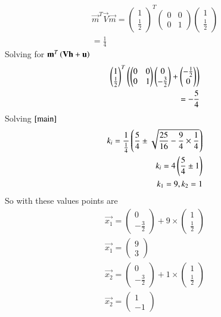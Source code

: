 \documentclass[a5paper,10pt]{article}
\begin{document}
\begin{align}
    \vec{m}^T\vec{V}\vec{m}=\begin{pmatrix}1 \\ \frac{1}{2}\end{pmatrix}^T\begin{pmatrix}0&0\\0&1\end{pmatrix}\begin{pmatrix}1 \\ \frac{1}{2}\end{pmatrix}\\
    =\frac{1}{4}\label{mv}
\end{align}
Solving for $\mathbf{m}^T\left(\mathbf{V}\mathbf{h}+\mathbf{u}\right)$
\begin{align}
    \begin{pmatrix}1 \\ \frac{1}{2}\end{pmatrix}^T\left(\begin{pmatrix}0&0\\0&1\end{pmatrix}\begin{pmatrix}0\\-\frac{3}{2}\end{pmatrix}+\begin{pmatrix}-\frac{1}{2}\\0\end{pmatrix}\right)\\
    =-\frac{5}{4}
\end{align}
Solving $\eqref{main}$
\begin{align}
    k_i=\frac{1}{\frac{1}{4}}\left(\frac{5}{4} \pm \sqrt{\frac{25}{16} - \frac{9}{4}\times \frac{1}{4}}\right)\\
    k_i=4\left(\frac{5}{4} \pm 1\right)\\
    k_1=9,k_2=1
\end{align}
So with these values points are
\begin{align}
    \vec{x_1}=\begin{pmatrix}0\\-\frac{3}{2}\end{pmatrix}+9\times \begin{pmatrix}1\\\frac{1}{2}\end{pmatrix}\\
    \vec{x_1}= \begin{pmatrix}9\\ 3\end{pmatrix} \\
    \vec{x_2}=\begin{pmatrix}0\\-\frac{3}{2}\end{pmatrix}+1\times \begin{pmatrix}1\\\frac{1}{2}\end{pmatrix}\\
    \vec{x_2}= \begin{pmatrix}1\\ -1\end{pmatrix}
\end{align}
\end{document}

